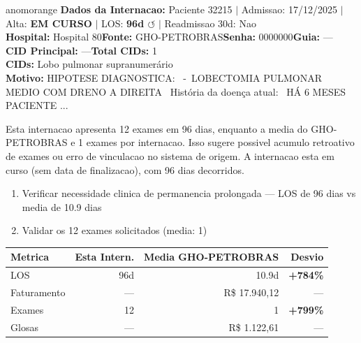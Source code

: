 \documentclass[a4paper,10pt]{article}
\begin{document}
\begin{anomalycard}[Internacao 159453 | GHO-PETROBRAS | ALTO (z=4.06)]{anomorange}
\textbf{Dados da Internacao:} Paciente 32215 $\mid$ Admissao: 17/12/2025 $\mid$ Alta: \textcolor{anomorange}{\textbf{EM CURSO}} $\mid$ LOS: \textbf{96d \textcolor{anomorange}{$\circlearrowleft$}} $\mid$ Readmissao 30d: Nao\\
\textbf{Hospital:} Hospital 80\quad\textbf{Fonte:} GHO-PETROBRAS\quad\textbf{Senha:} 0000000\quad\textbf{Guia:} ---\\
\textbf{CID Principal:} {\small ---}\quad\textbf{Total CIDs:} 1\\

\textbf{CIDs:} {\scriptsize Lobo pulmonar supranumerário}\\

\textbf{Motivo:} {\scriptsize HIPOTESE DIAGNOSTICA:   - LOBECTOMIA PULMONAR MEDIO COM DRENO A DIREITA    História da doença atual:   HÁ 6 MESES PACIENTE ...}\\

\vspace{2pt}\begin{tcolorbox}[colback=severityred!20,colframe=anomorange,title={\textbf{Interpretacao de Negocio}},fonttitle=\bfseries\small,left=4pt,right=4pt,top=3pt,bottom=3pt]
{\small Esta internacao apresenta 12 exames em 96 dias, enquanto a media do GHO-PETROBRAS e 1 exames por internacao. Isso sugere possivel acumulo retroativo de exames ou erro de vinculacao no sistema de origem. A internacao esta em curso (sem data de finalizacao), com 96 dias decorridos.}
\end{tcolorbox}
\begin{tcolorbox}[colback=severityyellow!30,colframe=anomorange,title={\textbf{Recomendacoes Especificas}},fonttitle=\bfseries\small,left=4pt,right=4pt,top=3pt,bottom=3pt]
\begin{enumerate}[nosep,leftmargin=16pt]
\item {\small Verificar necessidade clinica de permanencia prolongada --- LOS de 96 dias vs media de 10.9 dias}
\item {\small Validar os 12 exames solicitados (media: 1)}
\end{enumerate}
\end{tcolorbox}
\begin{center}\begin{tabular}{l r r r}\toprule\textbf{Metrica} & \textbf{Esta Intern.} & \textbf{Media GHO-PETROBRAS} & \textbf{Desvio} \\\midrule
LOS & 96d & 10.9d & \textcolor{anomred}{\textbf{+784\%}} \\
Faturamento & --- & R\$ 17.940,12 & --- \\
Exames & 12 & 1 & \textcolor{anomred}{\textbf{+799\%}} \\
Glosas & --- & R\$ 1.122,61 & --- \\
\bottomrule\end{tabular}\end{center}


\end{anomalycard}
\end{document}
